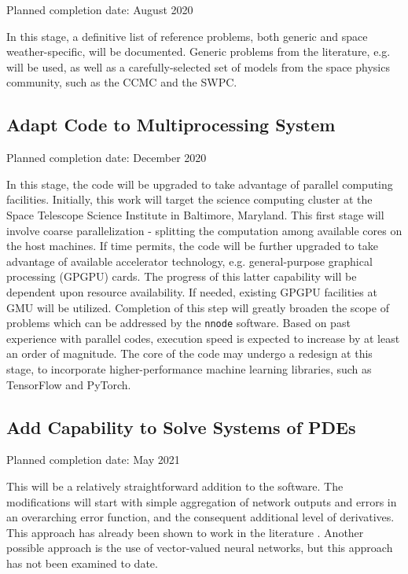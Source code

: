 \documentclass{article}
\begin{document}
Planned completion date: August 2020

In this stage, a definitive list of reference problems, both generic and space weather-specific, will be documented. Generic problems from the literature, e.g. \cite{Lagaris1998} will be used, as well as a carefully-selected set of models from the space physics community, such as the CCMC and the SWPC.

\subsection{Adapt Code to Multiprocessing System}

Planned completion date: December 2020

In this stage, the code will be upgraded to take advantage of parallel computing facilities. Initially, this work will target the science computing cluster at the Space Telescope Science Institute in Baltimore, Maryland. This first stage will involve coarse parallelization - splitting the computation among available cores on the host machines. If time permits, the code will be further upgraded to take advantage of available accelerator technology, e.g. general-purpose graphical processing (GPGPU) cards. The progress of this latter capability will be dependent upon resource availability. If needed, existing GPGPU facilities at GMU will be utilized. Completion of this step will greatly broaden the scope of problems which can be addressed by the \texttt{nnode} software. Based on past experience with parallel codes, execution speed is expected to increase by at least an order of magnitude. The core of the code may undergo a redesign at this stage, to incorporate higher-performance machine learning libraries, such as TensorFlow and PyTorch.

\subsection{Add Capability to Solve Systems of PDEs}

Planned completion date: May 2021

This will be a relatively straightforward addition to the software. The modifications will start with simple aggregation of network outputs and errors in an overarching error function, and the consequent additional level of derivatives. This approach has already been shown to work in the literature \cite{Lagaris1998}. Another possible approach is the use of vector-valued neural networks, but this approach has not been examined to date.
\end{document}
